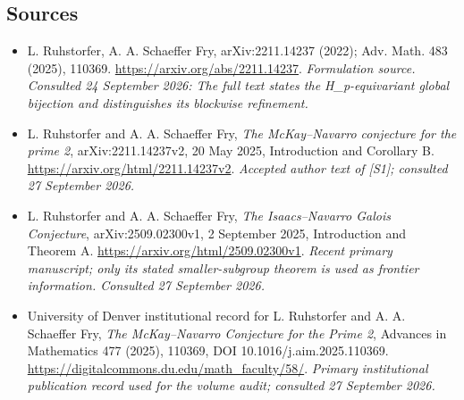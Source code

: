 \documentclass[11pt]{article}
\begin{document}
\subsection{Sources}
\begin{itemize}
\item[S1]L. Ruhstorfer, A. A. Schaeffer Fry, arXiv:2211.14237 (2022); Adv. Math. 483 (2025), 110369.
\url{https://arxiv.org/abs/2211.14237}.
\textit{Formulation source. Consulted 24 September 2026: The full text states the H\_p-equivariant global bijection and distinguishes its blockwise refinement.}
\item[E1] L. Ruhstorfer and A. A. Schaeffer Fry,
\emph{The McKay--Navarro conjecture for the prime 2},
arXiv:2211.14237v2, 20 May 2025, Introduction and Corollary B.
\url{https://arxiv.org/html/2211.14237v2}.
\textit{Accepted author text of [S1]; consulted 27 September 2026.}
\item[E2] L. Ruhstorfer and A. A. Schaeffer Fry,
\emph{The Isaacs--Navarro Galois Conjecture},
arXiv:2509.02300v1, 2 September 2025, Introduction and Theorem A.
\url{https://arxiv.org/html/2509.02300v1}.
\textit{Recent primary manuscript; only its stated smaller-subgroup theorem
is used as frontier information. Consulted 27 September 2026.}
\item[E3] University of Denver institutional record for
L. Ruhstorfer and A. A. Schaeffer Fry,
\emph{The McKay--Navarro Conjecture for the Prime 2},
Advances in Mathematics 477 (2025), 110369,
DOI 10.1016/j.aim.2025.110369.
\url{https://digitalcommons.du.edu/math_faculty/58/}.
\textit{Primary institutional publication record used for the volume audit;
consulted 27 September 2026.}
\end{itemize}
\end{document}
